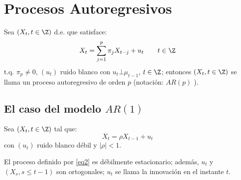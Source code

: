 \section{Procesos Autoregresivos}

\begin{definicion}
 Sea $\left( {X_{t}, t\in \Z} \right)$ d.e. que satisface:
\[
X_{t} =\sum_{j=1}^p {\pi_{j} X_{t-j} +u_{t} } 
\qquad
t\in \Z
\]
t.q. $\pi_{p} \ne 0$, $\left( {u_{t} } \right)$ ruido blanco con $u_{t} \bot \mu_{t-1}$, $t\in \Z$; entonces $\left( {X_{t}, t\in \Z} \right)$ se llama un proceso autoregresivo de orden $p$ (notaci\'{o}n: $AR(p)$ ).
\end{definicion}


\subsection{El caso del modelo $AR(1)$}

Sea $\left(X_{t}, t\in \Z \right)$ tal que:
\begin{equation}
\label{eq2}
X_{t} =\rho X_{t-1} +u_{t} 
\end{equation}
con $\left( {u_{t} } \right)$ ruido blanco d\'{e}bil y $\left| \rho \right|<1$.\newline

El proceso definido por \eqref{eq2} es d\'{e}bilmente estacionario; adem\'{a}s, $u_{t} $ y $\left( {X_{s}, s\le t-1} \right)$ son ortogonales; $u_{t} $ se llama la innovaci\'{o}n en el instante $t$.


